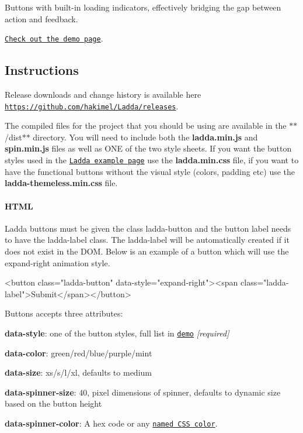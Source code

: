 Buttons with built-\/in loading indicators, effectively bridging the gap between action and feedback.

\href{http://lab.hakim.se/ladda/}{\tt Check out the demo page}.

\subsection*{Instructions}

Release downloads and change history is available here \href{https://github.com/hakimel/Ladda/releases}{\tt https\+://github.\+com/hakimel/\+Ladda/releases}.

The compiled files for the project that you should be using are available in the $\ast$$\ast$/dist$\ast$$\ast$ directory. You will need to include both the {\bfseries ladda.\+min.\+js} and {\bfseries spin.\+min.\+js} files as well as O\+NE of the two style sheets. If you want the button styles used in the \href{http://lab.hakim.se/ladda}{\tt Ladda example page} use the {\bfseries ladda.\+min.\+css} file, if you want to have the functional buttons without the visual style (colors, padding etc) use the {\bfseries ladda-\/themeless.\+min.\+css} file.

\paragraph*{H\+T\+ML}

Ladda buttons must be given the class {\ttfamily ladda-\/button} and the button label needs to have the {\ttfamily ladda-\/label} class. The {\ttfamily ladda-\/label} will be automatically created if it does not exist in the D\+OM. Below is an example of a button which will use the expand-\/right animation style.


\begin{DoxyCode}
<button class="ladda-button" data-style="expand-right"><span class="ladda-label">Submit</span></button>
\end{DoxyCode}


Buttons accepts three attributes\+:
\begin{DoxyItemize}
\item {\bfseries data-\/style}\+: one of the button styles, full list in \href{http://lab.hakim.se/ladda/}{\tt demo} {\itshape \mbox{[}required\mbox{]}}
\item {\bfseries data-\/color}\+: green/red/blue/purple/mint
\item {\bfseries data-\/size}\+: xs/s/l/xl, defaults to medium
\item {\bfseries data-\/spinner-\/size}\+: 40, pixel dimensions of spinner, defaults to dynamic size based on the button height
\item {\bfseries data-\/spinner-\/color}\+: A hex code or any \href{http://css-tricks.com/snippets/css/named-colors-and-hex-equivalents/}{\tt named C\+SS color}.
\end{DoxyItemize}


